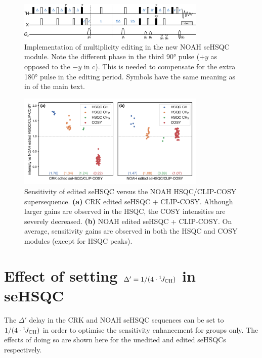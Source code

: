 \begin{figure}
    \centering
    \includegraphics[width=0.8\textwidth]{./figures/mult_edit.png}
    \caption{
        Implementation of multiplicity editing in the new NOAH seHSQC module.
        Note the different phase in the third \proton{} \ang{90} pulse ($+y$ as opposed to the $-y$ in c).
        This is needed to compensate for the extra \proton{} \ang{180} pulse in the editing period.
        Symbols have the same meaning as in  of the main text.
    }
    \label{fig:edited_sehsqc_pprog}
\end{figure}

\begin{figure}
    \centering
    \includegraphics[width=0.8\textwidth]{./figures/edited_sn_comp.png}
    \caption{
        Sensitivity of edited seHSQC versus the NOAH HSQC/CLIP-COSY supersequence.
        \textbf{(a)} CRK edited seHSQC + CLIP-COSY.
        Although larger gains are observed in the HSQC, the COSY intensities are severely decreased.
        \textbf{(b)} NOAH edited seHSQC + CLIP-COSY.
        On average, sensitivity gains are observed in both the HSQC and COSY modules (except for HSQC  peaks).
        \andro{}
    }
    \label{fig:edited_sn_comp}
\end{figure}

\section{Effect of setting \texorpdfstring{$\Delta' = 1/(4\cdot\onejch)$}{Delta' = 1/(4*1JCH)} in seHSQC}

The $\Delta'$ delay in the CRK and NOAH seHSQC sequences can be set to $1/(4\cdot\onejch)$ in order to optimise the sensitivity enhancement for  groups only.
The effects of doing so are shown here for the unedited and edited seHSQCs respectively.

